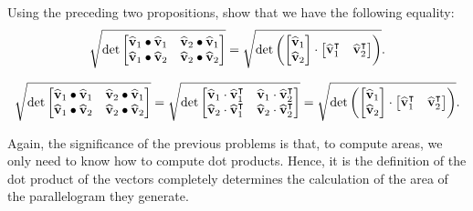 \documentclass[newpage,hints,handout]{ximera}
\begin{document}
\begin{problem} Using the preceding two propositions, 
show that we have the following equality:
\[
\sqrt{
  \det
\begin{bmatrix}
\hat{\mathbf v}_{1}\bullet\hat{\mathbf v}_{1} & \hat{\mathbf v}_{2}\bullet\hat{\mathbf v}_{1}\\
\hat{\mathbf v}_{1}\bullet\hat{\mathbf v}_{2} & \hat{\mathbf v}_{2}\bullet\hat{\mathbf v}_{2}%
\end{bmatrix}}
=
\sqrt{
  \det\left(
\begin{bmatrix}
\hat{\mathbf v}_{1} \\
\hat{\mathbf v}_{2}
\end{bmatrix}
\cdot
\begin{bmatrix}
\hat{\mathbf v}_{1}^\transpose  & \hat{\mathbf v}_{2}^\transpose 
\end{bmatrix}\right)}.
\]

\begin{freeResponse}
\[
\sqrt{
  \det
\begin{bmatrix}
\hat{\mathbf v}_{1}\bullet\hat{\mathbf v}_{1} & \hat{\mathbf v}_{2}\bullet\hat{\mathbf v}_{1}\\
\hat{\mathbf v}_{1}\bullet\hat{\mathbf v}_{2} & \hat{\mathbf v}_{2}\bullet\hat{\mathbf v}_{2}%
\end{bmatrix}}
=\sqrt{
  \det
\begin{bmatrix}
\hat{\mathbf v}_{1}\cdot \hat{\mathbf v}_{1}^\transpose & \hat{\mathbf v}_{1}\cdot \hat{\mathbf v}_{2}^\transpose\\
\hat{\mathbf v}_{2}\cdot \hat{\mathbf v}_{1}^\transpose & \hat{\mathbf v}_{2}\cdot \hat{\mathbf v}_{2}^\transpose%
\end{bmatrix}}
=\sqrt{
  \det\left(
\begin{bmatrix}
\hat{\mathbf v}_{1} \\
\hat{\mathbf v}_{2}
\end{bmatrix}
\cdot
\begin{bmatrix}
\hat{\mathbf v}_{1}^\transpose  & \hat{\mathbf v}_{2}^\transpose 
\end{bmatrix}\right)}.
\]
\end{freeResponse}
\end{problem}

Again, the significance of the previous problems is that, to compute
areas, we only need to know how to compute dot products. Hence, it is
the definition of the dot product of the vectors completely determines
the calculation of the area of the parallelogram they generate.
\end{document}
